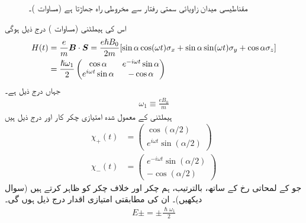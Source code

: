 \begin{figure}
\centering
{}
\caption{مقناطیسی میدان  زاویائی   سمتی رفتار  سے مخروطی راہ جھاڑتا ہے (مساوات )۔   }
\label{شکل_حرارت_نا_گزر_مخروطی_راہ_جھاڑنا}
\end{figure}


اس کی ہیملٹنی (مساوات  )   درج ذیل ہوگی
\begin{gather}
\begin{aligned}\label{مساوات_حر_مخصوص_ہیملٹنی}
H(t) &= \frac{e}{m} {{\boldsymbol{B}}} \cdot {\ensuremath{{\boldsymbol{S}}}} = \frac{e \hslash B_0}{2m} [\sin \alpha \cos(\omega t) \sigma_x + \sin \alpha \sin(\omega t) \sigma_y + \cos \alpha \sigma_z] \\
&= \frac{\hslash \omega_1}{2}
\begin{pmatrix}
\cos \alpha& e^{-i\omega t}\sin \alpha\\
e^{i\omega t}\sin\alpha& -\cos\alpha
\end{pmatrix} 
\end{aligned}
\end{gather}
جہاں  درج ذیل ہے۔
\begin{align}
\omega_1 \equiv \frac{e B_0}{m}
\end{align}
ہیملٹنی  کے معمول شدہ امتیازی چکر کار   اور  درج ذیل ہیں
\begin{align}
\chi_+ (t) &= 
\begin{pmatrix}
\cos(\alpha/2) \\
e^{i \omega t} \sin(\alpha/2)
\end{pmatrix}\\
\chi_{-} (t) &= 
\begin{pmatrix}
e^{-i \omega t} \sin(\alpha/2) \\
- \cos(\alpha/2)
\end{pmatrix}
\end{align}
جو  کے لمحاتی رخ کے ساتھ، بالترتیب،  ہم چکر اور خلاف چکر کو ظاہر کرتے ہیں (سوال    دیکھیں)۔  ان کی مطابقتی امتیازی اقدار درج ذیل ہوں گی۔
\begin{align}
E \pm = \pm \frac{\hslash \omega_1}{2}
\end{align}

